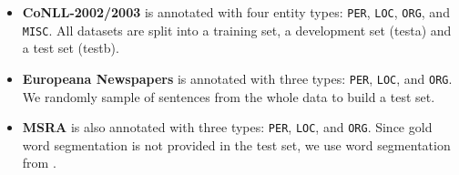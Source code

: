 \documentclass[letterpaper]{article} \usepackage{aaai20}  \usepackage{times}  \usepackage{helvet} \usepackage{courier}  \usepackage[hyphens]{url}  \usepackage{graphicx} \urlstyle{rm} \def\UrlFont{\rm}  \usepackage{graphicx}
\begin{document}
\begin{itemize}
    \item \textbf{CoNLL-2002/2003} is annotated with four entity types: \texttt{PER}, \texttt{LOC}, \texttt{ORG}, and \texttt{MISC}. All datasets are split into a training set, a development set (testa) and a test set (testb).
    
    \item \textbf{Europeana Newspapers} is annotated with three types: \texttt{PER}, \texttt{LOC}, and \texttt{ORG}. We randomly sample  of sentences from the whole data to build a test set.
    
    \item \textbf{MSRA} is also annotated with three types: \texttt{PER}, \texttt{LOC}, and \texttt{ORG}. Since gold word segmentation is not provided in the test set, we use word segmentation from \cite{zhang2018chinese}. \end{itemize}

\begin{table}[t]
    \centering
    \setlength{\tabcolsep}{1.5mm}
    \caption{Dataset statistics.}
    \label{tab:dataset}
\end{table}
 
\end{document}
